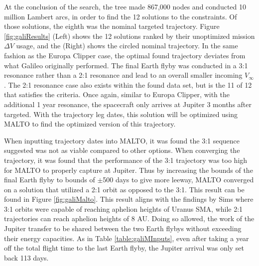 \documentclass[letterpaper, preprint, paper,11pt]{AAS}	%
\begin{document}
At the conclusion of the search, the tree made 867,000 nodes and conducted 10 million Lambert arcs, in order to find the 12 solutions to the constraints. Of those solutions, the eighth was the nominal targeted trajectory. Figure \ref*{fig:galiResults} (Left) shows the 12 solutions ranked by their unoptimized mission $\Delta V$ usage, and the (Right) shows the circled nominal trajectory. In the same fashion as the Europa Clipper case, the optimal found trajectory deviates from what Galileo originally performed. The final Earth flyby was conducted in a 3:1 resonance rather than a 2:1 resonance and lead to an overall smaller incoming $V_\infty$. The 2:1 resonance case also exists within the found data set, but is the 11 of 12 that satisfies the criteria. Once again, similar to Europa Clipper, with the additional 1 year resonance, the spacecraft only arrives at Jupiter 3 months after targeted. With the trajectory leg dates, this solution will be optimized using MALTO to find the optimized version of this trajectory. 

When inputting trajectory dates into MALTO, it was found the 3:1 sequence suggested was not as viable compared to other options. When converging the trajectory, it was found that the performance of the 3:1 trajectory was too high for MALTO to properly capture at Jupiter. Thus by increasing the bounds of the final Earth flyby to bounds of $\pm$500 days to give more leeway, MALTO converged on a solution that utilized a 2:1 orbit as opposed to the 3:1. This result can be found in Figure \ref*{fig:galiMalto}. This result aligns with the findings by Sims \cite{sims1994} where 3:1 orbits were capable of reaching aphelion heights of Uranus SMA, while 2:1 trajectories can reach aphelion heights of 8 AU. Doing so allowed, the work of the Jupiter transfer to be shared between the two Earth flybys without exceeding their energy capacities. As in Table \ref*{table:galiMInputs}, even after taking a year off the total flight time to the last Earth flyby, the Jupiter arrival was only set back 113 days. 
\end{document}

